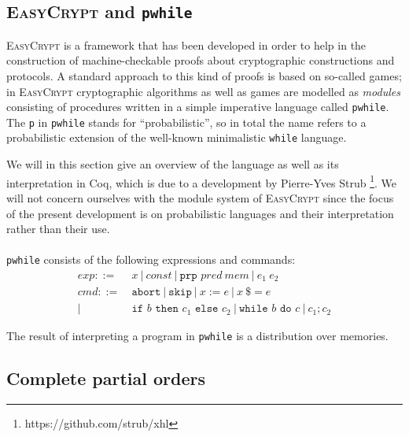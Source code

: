\documentclass[11pt, leqno]{article}
\theoremstyle{definition}
\begin{document}
\subsection{\textsc{EasyCrypt} and \texttt{pwhile}}
\textsc{EasyCrypt} is a framework that has been developed in order to help in the
construction of machine-checkable proofs about cryptographic constructions and
protocols. %
A standard approach to this kind of proofs is based on so-called games; in
\textsc{EasyCrypt} cryptographic algorithms as well as games are modelled as
\textit{modules} consisting of procedures written in a simple imperative language
called \texttt{pwhile}. The \texttt{p} in \texttt{pwhile} stands for
``probabilistic'', so in total the name refers to a probabilistic extension of the
well-known minimalistic \texttt{while} language.

We will in this section give an overview of the language as well as its
interpretation in Coq, which is due to a development by Pierre-Yves Strub
\footnote{https://github.com/strub/xhl}. We will not concern ourselves with the
module system of \textsc{EasyCrypt} since the focus of the present development is
on probabilistic languages and their interpretation rather than their use.\\
\\
\texttt{pwhile} consists of the following expressions and commands: 
\begin{align*}
  exp ::=~& x ~\vert ~ const ~\vert ~ \texttt{prp } pred~mem ~\vert ~ e_1\ e_2\\
  cmd ::=~& \texttt{abort} ~\vert ~ \texttt{skip} ~\vert ~ x := e ~\vert ~ x\ \$= e\\
  \vert ~ & \texttt{if } b \texttt{ then } c_1 \texttt{ else } c_2 ~\vert ~
            \texttt{while } b \texttt{ do } c ~\vert ~ c_1 ; c_2
\end{align*}


The result of interpreting a program in \texttt{pwhile} is a distribution over
memories.



\subsection{Complete partial orders}
\end{document}
